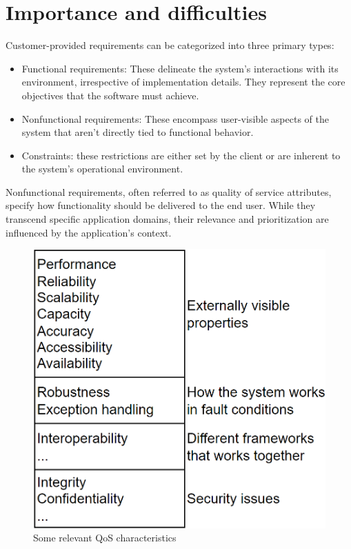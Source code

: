 \section{Importance and difficulties}

Customer-provided requirements can be categorized into three primary types:
\begin{itemize}
    \item Functional requirements: These delineate the system's interactions with its environment, irrespective of implementation details. 
        They represent the core objectives that the software must achieve.
    \item Nonfunctional requirements: These encompass user-visible aspects of the system that aren't directly tied to functional behavior.
    \item Constraints: these restrictions are either set by the client or are inherent to the system's operational environment.
\end{itemize}
Nonfunctional requirements, often referred to as quality of service attributes, specify how functionality should be delivered to the end user. 
While they transcend specific application domains, their relevance and prioritization are influenced by the application's context.
\begin{figure}[H]
    \centering
    \includegraphics[width=0.35\linewidth]{images/QoS.png}
    \caption{Some relevant QoS characteristics}
\end{figure}